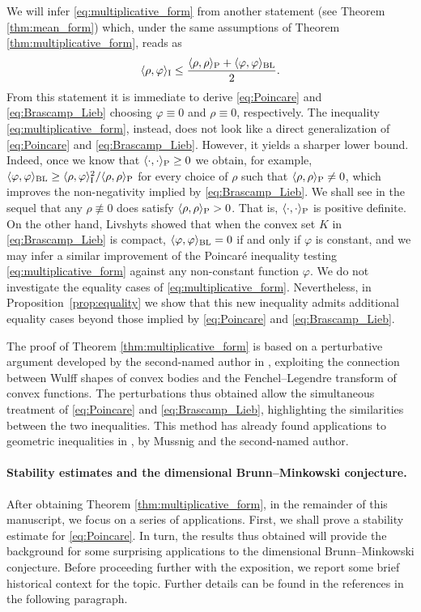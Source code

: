 \documentclass[a4paper, 11pt]{article}
\theoremstyle{definition}
\begin{document}
We will infer \eqref{eq:multiplicative_form} from another statement (see Theorem \ref{thm:mean_form}) which, under the same assumptions of Theorem \ref{thm:multiplicative_form}, reads as \[ \langle \rho, \varphi \rangle_{\rm I} \leq \frac{\langle \rho, \rho \rangle_{\rm P} + \langle \varphi, \varphi \rangle_{\rm BL}}{2}.\] From this statement it is immediate to derive \eqref{eq:Poincare} and \eqref{eq:Brascamp_Lieb} choosing $\varphi \equiv 0$ and $\rho \equiv 0$, respectively. The inequality \eqref{eq:multiplicative_form}, instead, does not look like a direct generalization of \eqref{eq:Poincare} and \eqref{eq:Brascamp_Lieb}. However, it yields a sharper lower bound. Indeed, once we know that $\langle \cdot ,\cdot \rangle_{\rm P} \geq 0 $ we obtain, for example, $\langle\varphi,\varphi\rangle_{\rm BL} \geq \langle \rho,\varphi\rangle_{\rm I}^2/\langle \rho,\rho\rangle_{\rm P}$ for every choice of $\rho$ such that $\langle \rho,\rho\rangle _{\rm P} \neq 0$, which improves the non-negativity implied by \eqref{eq:Brascamp_Lieb}. We shall see in the sequel that any $\rho\not\equiv 0$ does satisfy $\langle \rho,\rho \rangle_{\rm P} >0$. That is, $\langle \cdot , \cdot \rangle_{\rm P}$ is positive definite. On the other hand, Livshyts \cite{GalynaStability} showed that when the convex set $K$ in \eqref{eq:Brascamp_Lieb} is compact, $\langle \varphi, \varphi \rangle_{\rm BL} =0$ if and only if $\varphi$ is constant, and we may infer a similar improvement of the Poincar\'e inequality testing \eqref{eq:multiplicative_form} against any non-constant function $\varphi$. We do not investigate the equality cases of \eqref{eq:multiplicative_form}. Nevertheless, in Proposition~\ref{prop:equality}  we show that this new inequality admits additional equality cases beyond those implied by \eqref{eq:Poincare} and \eqref{eq:Brascamp_Lieb}.

The proof of Theorem \ref{thm:multiplicative_form} is based on a perturbative argument developed by the second-named author in \cite{Ulivelli_Wulff}, exploiting the connection between Wulff shapes of convex bodies and the Fenchel--Legendre transform of convex functions. The perturbations thus obtained allow the simultaneous treatment of \eqref{eq:Poincare} and \eqref{eq:Brascamp_Lieb}, highlighting the similarities between the two inequalities. This method has already found applications to geometric inequalities in \cite{MussnigUlivelli_inequalities}, by Mussnig and the second-named author.

\paragraph{Stability estimates and the dimensional Brunn--Minkowski conjecture.}After obtaining Theorem \ref{thm:multiplicative_form}, in the remainder of this manuscript, we focus on a series of applications. First, we shall prove a stability estimate for \eqref{eq:Poincare}. In turn, the results thus obtained will provide the background for some surprising applications to the dimensional Brunn--Minkowski conjecture. Before proceeding further with the exposition, we report some brief historical context for the topic. Further details can be found in the references in the following paragraph.
\end{document}

